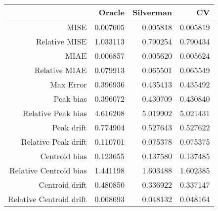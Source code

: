 \begin{tabular}{rrrr}
  \hline
 & Oracle & Silverman & CV \\ 
  \hline
MISE & 0.007605 & 0.005818 & 0.005819 \\ 
  Relative MISE & 1.033113 & 0.790254 & 0.790434 \\ 
  MIAE & 0.006857 & 0.005620 & 0.005624 \\ 
  Relative MIAE & 0.079913 & 0.065501 & 0.065549 \\ 
  Max Error & 0.396936 & 0.435413 & 0.435492 \\ 
  Peak bias & 0.396072 & 0.430709 & 0.430840 \\ 
  Relative Peak bias & 4.616208 & 5.019902 & 5.021431 \\ 
  Peak drift & 0.774904 & 0.527643 & 0.527622 \\ 
  Relative Peak drift & 0.110701 & 0.075378 & 0.075375 \\ 
  Centroid bias & 0.123655 & 0.137580 & 0.137485 \\ 
  Relative Centroid bias & 1.441198 & 1.603488 & 1.602385 \\ 
  Centroid drift & 0.480850 & 0.336922 & 0.337147 \\ 
  Relative Centroid drift & 0.068693 & 0.048132 & 0.048164 \\ 
   \hline
\end{tabular}
